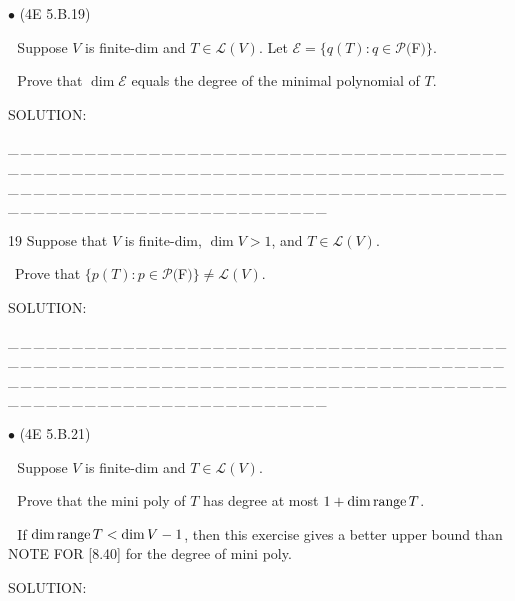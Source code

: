 \documentclass[a4paper, 11pt, UTF8]{article}
\def\range{\textup{range}\,}
\def\Lm{\mathcal{L}}
\def\Po{\mathcal{P}}
\begin{document}
\begin{large}
{\small $\bullet$} (\normalsize{4E 5.B.19})\par\,\, {\timessl\Large 
Suppose $V$ is finite-dim and $T\in \Lm(V)$. Let $\mathcal{E} = \{q(T): q \in \Po(${\timesbf F}$)\}$.
}\par\,\,
{\timessl\Large
Prove that $\dim \mathcal{E}$ equals the degree of the minimal polynomial of $T$.
}\par
{\timesbf S\footnotesize{OLUTION:}}\par\quad

\par
{\tiny \_\,\_\,\_\,\_\,\_\,\_\,\_\,\_\,\_\,\_\,\_\,\_\,\_\,\_\,\_\,\_\,\_\,\_\,\_\,\_\,\_\,\_\,\_\,\_\,\_\,\_\,\_\,\_\,\_\,\_\,\_\,\_\,\_\,\_\,\_\,\_\,\_\,\_\,\_\,\_\,\_\,\_\,\_\,\_\,\_\,\_\,\_\,\_\,\_\,\_\,\_\,\_\,\_\,\_\,\_\,\_\,\_\,\_\,\_\,\_\,\_\,\_\,\_\,\_\,\_\,\_\,\_\,\_\,\_\,\_\,\_\_\,\_\,\_\,\_\,\_\,\_\,\_\,\_\,\_\,\_\,\_\,\_\,\_\,\_\,\_\,\_\,\_\,\_\,\_\,\_\,\_\,\_\,\_\,\_\,\_\,\_\,\_\,\_\,\_\,\_\,\_\,\_\,\_\,\_\,\_\,\_\,\_\,\_\,\_\,\_\,\_\,\_\,\_\,\_\,\_\,\_\,\_\,\_\,\_\,\_\,\_\,\_\,\_\,\_\,\_\,\_\,\_\,\_\,\_\,\_\,\_\,\_\,\_\,\_\,\_\,\_\,\_\,\_\,\_\,\_\,\_}\par

{\timesbf\Large 19} {\timessl\Large Suppose that $V$ is finite-dim, $\dim V > 1$, and $T\in\Lm(V)$.}\par\quad\,
{\timessl\Large Prove that
$\{p(T):p\in\Po(${\timesbf F}$)\}\neq\Lm(V)$.
}\par
{\timesbf S\footnotesize{OLUTION:}}\par\quad

\par
{\tiny \_\,\_\,\_\,\_\,\_\,\_\,\_\,\_\,\_\,\_\,\_\,\_\,\_\,\_\,\_\,\_\,\_\,\_\,\_\,\_\,\_\,\_\,\_\,\_\,\_\,\_\,\_\,\_\,\_\,\_\,\_\,\_\,\_\,\_\,\_\,\_\,\_\,\_\,\_\,\_\,\_\,\_\,\_\,\_\,\_\,\_\,\_\,\_\,\_\,\_\,\_\,\_\,\_\,\_\,\_\,\_\,\_\,\_\,\_\,\_\,\_\,\_\,\_\,\_\,\_\,\_\,\_\,\_\,\_\,\_\,\_\_\,\_\,\_\,\_\,\_\,\_\,\_\,\_\,\_\,\_\,\_\,\_\,\_\,\_\,\_\,\_\,\_\,\_\,\_\,\_\,\_\,\_\,\_\,\_\,\_\,\_\,\_\,\_\,\_\,\_\,\_\,\_\,\_\,\_\,\_\,\_\,\_\,\_\,\_\,\_\,\_\,\_\,\_\,\_\,\_\,\_\,\_\,\_\,\_\,\_\,\_\,\_\,\_\,\_\,\_\,\_\,\_\,\_\,\_\,\_\,\_\,\_\,\_\,\_\,\_\,\_\,\_\,\_\,\_\,\_\,\_}\par

{\small $\bullet$} (\normalsize{4E 5.B.21})\par\,\, {\timessl\Large 
Suppose $V$ is finite-dim and $T\in \Lm(V)$.}\par\,\,
{\timessl\Large Prove that the mini poly of $T$ has degree at most $1 + \dim \range T$.}\par\,\,
{\timessl\small
If $\dim \range T < \dim V - 1$, then this exercise gives a better upper bound than N{\scriptsize OTE} F{\scriptsize OR} [8.40] for the degree of mini poly.
}\par
{\timesbf S\footnotesize{OLUTION:}}\par\quad


\end{large}
\end{document}

